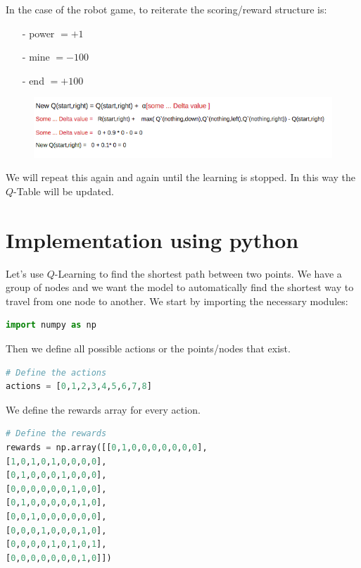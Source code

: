 In the case of the robot game, to reiterate the scoring/reward structure is:

\begin{itemize}
\setlength{\parskip}{0pt}
\item[-]
power $= +1$
\item[-]
mine $= -100$
\item[-]
end $= +100$
\end{itemize}

\begin{figure}[h]
\centering
\includegraphics[scale=0.7]{pix/q_learning/q_robot_maze_iteration.png}
\end{figure}
We will repeat this again and again until the learning is stopped. In this way 
the $Q$-Table will be updated.


%
\section{Implementation using python}
%

Let's use $Q$-Learning to find the shortest path between two points. We have a group 
of nodes and we want the model to automatically find the shortest way to travel from 
one node to another. We start by importing the necessary modules:

\begin{lstlisting}[language=Python]
import numpy as np
\end{lstlisting}

Then we define all possible actions or the points/nodes that exist.
\begin{lstlisting}[language=Python]
# Define the actions
actions = [0,1,2,3,4,5,6,7,8]
\end{lstlisting}

We define the rewards array for every action.
\begin{lstlisting}[language=Python]
# Define the rewards
rewards = np.array([[0,1,0,0,0,0,0,0,0],
[1,0,1,0,1,0,0,0,0],
[0,1,0,0,0,1,0,0,0],
[0,0,0,0,0,0,1,0,0],
[0,1,0,0,0,0,0,1,0],
[0,0,1,0,0,0,0,0,0],
[0,0,0,1,0,0,0,1,0],
[0,0,0,0,1,0,1,0,1],
[0,0,0,0,0,0,0,1,0]])
\end{lstlisting}

